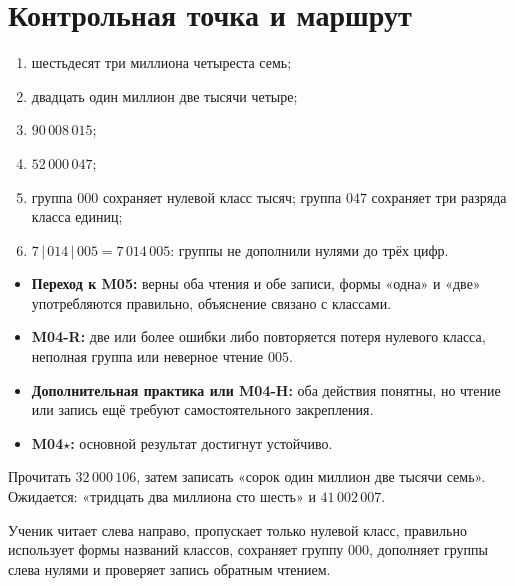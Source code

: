 \newpage
\section{Контрольная точка и маршрут}

\begin{teacherbox}[Ответы]
  \begin{enumerate}
    \item шестьдесят три миллиона четыреста семь;
    \item двадцать один миллион две тысячи четыре;
    \item \(90\,008\,015\);
    \item \(52\,000\,047\);
    \item группа \(000\) сохраняет нулевой класс тысяч; группа \(047\) сохраняет
      три разряда класса единиц;
    \item \(7\,|\,014\,|\,005=7\,014\,005\): группы не дополнили нулями до
      трёх цифр.
  \end{enumerate}
\end{teacherbox}

\begin{resultbox}
  \begin{itemize}
    \item \textbf{Переход к M05:} верны оба чтения и обе записи, формы «одна» и
      «две» употребляются правильно, объяснение связано с классами.
    \item \textbf{M04-R:} две или более ошибки либо повторяется потеря нулевого
      класса, неполная группа или неверное чтение \(005\).
    \item \textbf{Дополнительная практика или M04-H:} оба действия понятны,
      но чтение или запись ещё требуют самостоятельного закрепления.
    \item \textbf{M04\(\star\):} основной результат достигнут устойчиво.
  \end{itemize}
\end{resultbox}

\begin{teacherbox}
  Прочитать \(32\,000\,106\), затем записать «сорок один миллион две тысячи
  семь». Ожидается: «тридцать два миллиона сто шесть» и \(41\,002\,007\).
\end{teacherbox}

\begin{teacherbox}
  Ученик читает слева направо, пропускает только нулевой класс, правильно
  использует формы названий классов, сохраняет группу \(000\), дополняет группы
  слева нулями и проверяет запись обратным чтением.
\end{teacherbox}

